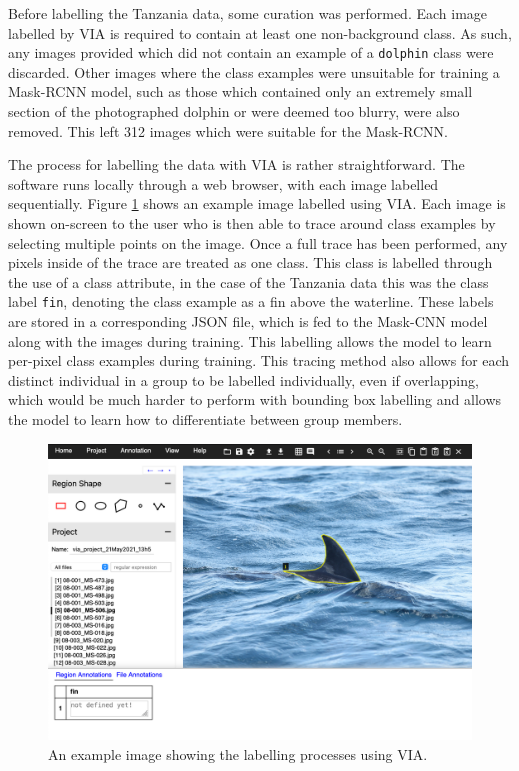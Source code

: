 Before labelling the Tanzania data, some curation was performed. Each image labelled by VIA is required to contain at least one non-background class. As such, any images provided which did not contain an example of a \texttt{dolphin} class were discarded. Other images where the class examples were unsuitable for training a Mask-RCNN model, such as those which contained only an extremely small section of the photographed dolphin or were deemed too blurry, were also removed. This left 312 images which were suitable for the Mask-RCNN.

The process for labelling the data with VIA is rather straightforward. The software runs locally through a web browser, with each image labelled sequentially. Figure \ref{fig:via-json-example-zanzibar} shows an example image labelled using VIA. Each image is shown on-screen to the user who is then able to trace around class examples by selecting multiple points on the image. Once a full trace has been performed, any pixels inside of the trace are treated as one class. This class is labelled through the use of a class attribute, in the case of the Tanzania data this was the class label \texttt{fin}, denoting the class example as a fin above the waterline. These labels are stored in a corresponding JSON file, which is fed to the Mask-CNN model along with the images during training. This labelling allows the model to learn per-pixel class examples during training. This tracing method also allows for each distinct individual in a group to be labelled individually, even if overlapping, which would be much harder to perform with bounding box labelling and allows the model to learn how to differentiate between group members.  

  \begin{figure}
	\begin{center}
		\includegraphics[scale=0.4]{Chapter3/figs/via-json-example-zanzibar-1.png}
	\end{center}
	\caption{An example image showing the labelling processes using VIA.
	}
	\label{fig:via-json-example-zanzibar}
\end{figure}

